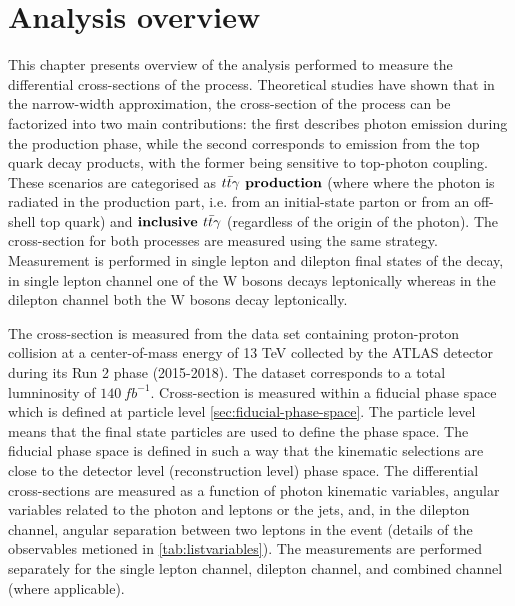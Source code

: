 \chapter{Analysis overview}
\label{analysis_overview}
This chapter presents overview of the analysis performed to measure the differential cross-sections of the \tty process. Theoretical studies have shown that in the narrow-width approximation, the cross-section of the \tty process can be factorized into two main contributions: the first describes photon emission during the production phase, while the second corresponds to emission from the top quark decay products, with the former being sensitive to top-photon coupling. These scenarios are categorised as $\textbf{\tty production}$ (where where the photon is radiated in the production part, i.e. from an initial-state parton or from an off-shell top quark) and $\textbf{inclusive $t\bar{t}\gamma$}$ (regardless of the origin of the photon). The cross-section for both processes are measured using the same strategy. Measurement is performed in single lepton and dilepton final states of the \ttbar decay, in single lepton channel one of the W bosons decays leptonically whereas in the dilepton channel both the W bosons decay leptonically. 

The cross-section is measured from the data set containing proton-proton collision at a center-of-mass energy of 13 TeV collected by the ATLAS detector during its Run 2 phase (2015-2018). The dataset corresponds to a total lumninosity of $140 \ fb^{-1}$. Cross-section is measured within a fiducial phase space which is defined at particle level \cref{sec:fiducial-phase-space}. The particle level means that the final state particles are used to define the phase space. The fiducial phase space is defined in such a way that the kinematic selections are close to the detector level (reconstruction level) phase space. The differential cross-sections are measured as a function of photon kinematic variables, angular variables related to the photon and leptons or the jets, and, in the dilepton channel, angular separation between two leptons in the event (details of the observables metioned in \cref{tab:listvariables}). The measurements are performed separately for the single lepton channel, dilepton channel, and combined channel (where applicable).

